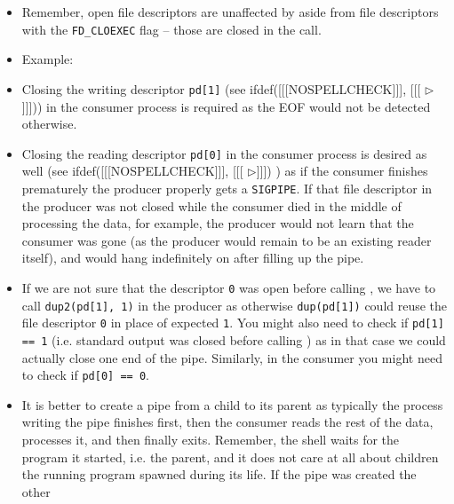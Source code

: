 
\begin{slide}
\begin{center}

\end{center}
\end{slide}

\label{FDSHARING}

\begin{itemize}
\item Remember, open file descriptors are unaffected by  aside from
file descriptors with the \texttt{FD\_CLOEXEC} flag -- those are closed in the
  call.
\item Example: 
\item Closing the writing descriptor \texttt{pd[1]} (see
ifdef([[[NOSPELLCHECK]]], [[[{\color[rgb]{1,0,0} $\triangleright$}]]]))
in the consumer process is required as the EOF would not be detected otherwise.
\item Closing the reading descriptor \texttt{pd[0]} in the consumer process is
desired as well (see
ifdef([[[NOSPELLCHECK]]], [[[{\color[rgb]{1,0,0} $\triangleright$}]]])
) as if the consumer finishes prematurely the producer properly gets a
\texttt{SIGPIPE}.
If that file descriptor in the producer was not closed while the consumer died
in the middle of processing the data, for example, the producer would not learn
that the consumer was gone (as the producer would remain to be an existing
reader itself), and would hang indefinitely on  after filling up
the pipe.
\item If we are not sure that the descriptor \texttt{0} was open before calling
, we have to call \texttt{dup2(pd[1], 1)} in the producer as
otherwise \texttt{dup(pd[1])} could reuse the file descriptor \texttt{0} in
place of expected \texttt{1}.  You might also need to check if \verb#pd[1] == 1#
(i.e. standard output was closed before calling ) as in that case we
could actually close one end of the pipe.  Similarly, in the consumer you might
need to check if \verb#pd[0] == 0#.
\item It is better to create a pipe from a child to its parent as typically the
process writing the pipe finishes first, then the consumer reads the rest of the
data, processes it, and then finally exits.  Remember, the shell waits for the
program it started, i.e. the parent, and it does not care at all about children
the running program spawned during its life.  If the pipe was created the other

\end{itemize}
